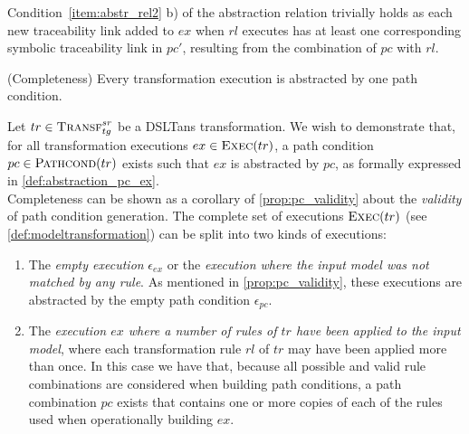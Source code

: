 \begin{ps}
\begin{itemize}
Condition~\ref{item:abstr_rel2} b) of the abstraction relation trivially holds as each new traceability link added to $ex$ when $rl$ executes has at least one corresponding symbolic traceability link in $pc'$, resulting from the combination of $pc$ with $rl$.  

\end{itemize}
\end{ps} 


\begin{proposition}{(Completeness)}
\label{prop:pc_completeness}
Every transformation execution is abstracted by one path condition.
\end{proposition}
\begin{pf}
Let $tr\in \textsc{Transf}^{sr}_{tg}$ be a DSLTans transformation. We wish to demonstrate that, for all transformation executions $ex\in \textsc{Exec}(tr)$, a path condition $pc\in \textsc{Pathcond}(tr)$ exists such that $ex$ is abstracted by $pc$, as formally expressed in \cref{def:abstraction_pc_ex}.\\ 

Completeness can be shown as a corollary of \cref{prop:pc_validity} about the \emph{validity} of path condition generation. The complete set of executions $\textsc{Exec}(tr)$ (see \cref{def:modeltransformation}) can be split into two kinds of executions:
\begin{enumerate}
  \item\label{lab:input_not_matched} The \emph{empty execution} $\epsilon_{ex}$ or the \emph{execution where the input model was not matched by any rule}. As mentioned in \cref{prop:pc_validity}, these executions are abstracted by the empty path condition $\epsilon_{pc}$.\vspace{.3cm}
  \item The \emph{execution $ex$ where a number of rules of $tr$ have been applied to the input model}, where each transformation rule $rl$ of $tr$ may have been applied more than once. In this case we have that, because all possible and valid rule combinations are considered when building path conditions, a path combination $pc$ exists that contains one or more copies of each of the rules used when operationally building $ex$. \\
  

\end{enumerate}
\end{pf}
